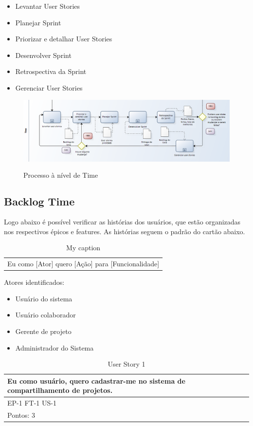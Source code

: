 \begin{itemize}
\item Levantar User Stories
\item Planejar Sprint
\item Priorizar e detalhar User Stories
\item Desenvolver Sprint
\item Retrospectiva da Sprint
\item Gerenciar User Stories
\end{itemize}

\FloatBarrier
\begin{figure}[!htpd]
		\centering
		\includegraphics[scale=0.4]{figuras/time}
		\label{img:time}
		\caption{Processo à nível de Time}
\end{figure}

\subsection{Backlog Time}

Logo abaixo é possível verificar as histórias dos usuários, que estão organizadas nos respectivos épicos e features. As histórias seguem o padrão do cartão abaixo.

\FloatBarrier
\begin{table}[!htpd]
\centering
\caption{My caption}
\label{my-label}
\begin{tabular}{l}
Eu como {[}Ator{]} quero {[}Ação{]} para {[}Funcionalidade{]}
\end{tabular}
\end{table}

Atores identificados:

\begin{itemize}
\item Usuário do sistema
\item Usuário colaborador
\item Gerente de projeto
\item Administrador do Sistema
\end{itemize}

\FloatBarrier
\begin{table}[!htpd]
\centering
\caption{User Story 1}
\label{my-label}
\begin{tabular}{|l|}
\hline
Eu como usuário, quero cadastrar-me no sistema de compartilhamento de projetos. \\ \hline
EP-1 FT-1 US-1                                                                  \\ \hline
Pontos: 3                                                                       \\ \hline
\end{tabular}
\end{table}

